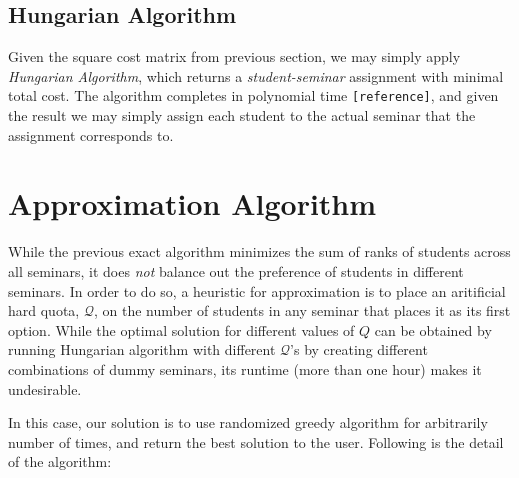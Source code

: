 \documentclass{article} %
\begin{document}
\subsection{Hungarian Algorithm}
    \par\qquad Given the square cost matrix from previous section, we may simply apply \emph{Hungarian Algorithm}, which returns a \emph{student-seminar} assignment with minimal total cost. The algorithm completes in polynomial time \texttt{[reference]}, and given the result we may simply assign each student to the actual seminar that the assignment corresponds to.

%
%
\section{Approximation Algorithm}
    \par\qquad While the previous exact algorithm minimizes the sum of ranks of students across all seminars, it does \emph{not} balance out the preference of students in different seminars. In order to do so, a heuristic for approximation is to place an aritificial hard quota, $\mathcal{Q}$, on the number of students in any seminar that places it as its first option. While the optimal solution for different values of $Q$ can be obtained by running Hungarian algorithm with different $\mathcal{Q}$'s by creating different combinations of dummy seminars, its runtime (more than one hour) makes it undesirable.
    \par\qquad In this case, our solution is to use randomized greedy algorithm for arbitrarily number of times, and return the best solution to the user. Following is the detail of the algorithm:
\end{document}
